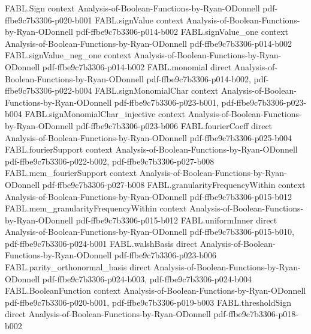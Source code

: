 \begin{theorem}
\proofstep
  {FABL.Sign}
  {context}
  {Analysis-of-Boolean-Functions-by-Ryan-ODonnell}
  {pdf-ffbe9c7b3306-p020-b001}
\proofstep
  {FABL.signValue}
  {context}
  {Analysis-of-Boolean-Functions-by-Ryan-ODonnell}
  {pdf-ffbe9c7b3306-p014-b002}
\proofstep
  {FABL.signValue_one}
  {context}
  {Analysis-of-Boolean-Functions-by-Ryan-ODonnell}
  {pdf-ffbe9c7b3306-p014-b002}
\proofstep
  {FABL.signValue_neg_one}
  {context}
  {Analysis-of-Boolean-Functions-by-Ryan-ODonnell}
  {pdf-ffbe9c7b3306-p014-b002}
\proofstep
  {FABL.monomial}
  {direct}
  {Analysis-of-Boolean-Functions-by-Ryan-ODonnell}
  {pdf-ffbe9c7b3306-p014-b002,
    pdf-ffbe9c7b3306-p022-b004}
\proofstep
  {FABL.signMonomialChar}
  {context}
  {Analysis-of-Boolean-Functions-by-Ryan-ODonnell}
  {pdf-ffbe9c7b3306-p023-b001,
    pdf-ffbe9c7b3306-p023-b004}
\proofstep
  {FABL.signMonomialChar_injective}
  {context}
  {Analysis-of-Boolean-Functions-by-Ryan-ODonnell}
  {pdf-ffbe9c7b3306-p023-b006}
\proofstep
  {FABL.fourierCoeff}
  {direct}
  {Analysis-of-Boolean-Functions-by-Ryan-ODonnell}
  {pdf-ffbe9c7b3306-p025-b004}
\proofstep
  {FABL.fourierSupport}
  {context}
  {Analysis-of-Boolean-Functions-by-Ryan-ODonnell}
  {pdf-ffbe9c7b3306-p022-b002,
    pdf-ffbe9c7b3306-p027-b008}
\proofstep
  {FABL.mem_fourierSupport}
  {context}
  {Analysis-of-Boolean-Functions-by-Ryan-ODonnell}
  {pdf-ffbe9c7b3306-p027-b008}
\proofstep
  {FABL.granularityFrequencyWithin}
  {context}
  {Analysis-of-Boolean-Functions-by-Ryan-ODonnell}
  {pdf-ffbe9c7b3306-p015-b012}
\proofstep
  {FABL.mem_granularityFrequencyWithin}
  {context}
  {Analysis-of-Boolean-Functions-by-Ryan-ODonnell}
  {pdf-ffbe9c7b3306-p015-b012}
\proofstep
  {FABL.uniformInner}
  {direct}
  {Analysis-of-Boolean-Functions-by-Ryan-ODonnell}
  {pdf-ffbe9c7b3306-p015-b010,
    pdf-ffbe9c7b3306-p024-b001}
\proofstep
  {FABL.walshBasis}
  {direct}
  {Analysis-of-Boolean-Functions-by-Ryan-ODonnell}
  {pdf-ffbe9c7b3306-p023-b006}
\proofstep
  {FABL.parity_orthonormal_basis}
  {direct}
  {Analysis-of-Boolean-Functions-by-Ryan-ODonnell}
  {pdf-ffbe9c7b3306-p024-b003,
    pdf-ffbe9c7b3306-p024-b004}
\proofstep
  {FABL.BooleanFunction}
  {context}
  {Analysis-of-Boolean-Functions-by-Ryan-ODonnell}
  {pdf-ffbe9c7b3306-p020-b001,
    pdf-ffbe9c7b3306-p019-b003}
\proofstep
  {FABL.thresholdSign}
  {direct}
  {Analysis-of-Boolean-Functions-by-Ryan-ODonnell}
  {pdf-ffbe9c7b3306-p018-b002}

\end{theorem}

